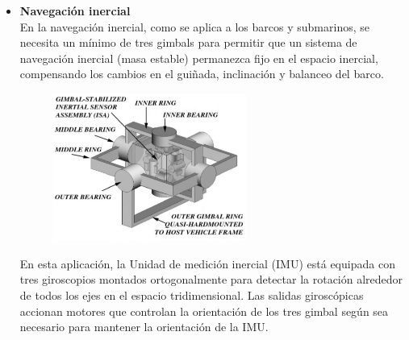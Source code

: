 \begin{itemize}
	\item \textbf{Navegación inercial}\\
	      En la navegación inercial, como se aplica a los barcos y submarinos, se necesita
	      un mínimo de tres gimbals para permitir que un sistema de navegación inercial
	      (masa estable) permanezca fijo en el espacio inercial, compensando los cambios
	      en el guiñada, inclinación y balanceo del barco.
	      \begin{figure}[htb]
		      \centering
		      \includegraphics[width=0.6\textwidth]{Contenido/Cuerpo/Capitulo1/Fig1.eps}
		      \label{fig:Introduccion:Fig2}
	      \end{figure}

	      En esta aplicación, la Unidad de medición inercial (IMU) está equipada con tres
	      giroscopios montados ortogonalmente para detectar la rotación alrededor de todos
	      los ejes en el espacio tridimensional. Las salidas giroscópicas accionan motores
	      que controlan la orientación de los tres gimbal según sea necesario para mantener
	      la orientación de la IMU.


\end{itemize}
